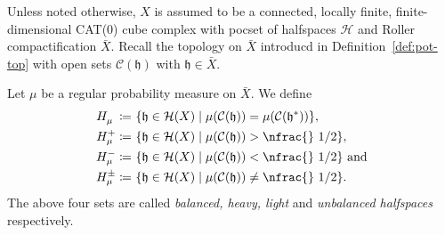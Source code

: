 Unless noted otherwise, \(X\) is assumed to be a connected, locally finite, finite-dimensional CAT(0) cube complex with pocset of halfspaces \(\mathcal{H}\) and Roller compactification \(\bar X\). Recall the topology on \(\bar X\) introducd in Definition~\ref{def:pot-top} with open sets \(\mathcal{C}(\mathfrak{h})\) with \(\mathfrak{h} \in \bar X\).

\begin{defin}
  Let \(\mu\) be a regular probability measure on \(\bar X\). We define
  \begin{align*}
    H_\mu^{\phantom{+}} \coloneqq &\ \{\mathfrak{h} \in \mathcal{H}(X) \mid \mu(\mathcal{C}(\mathfrak{h})) = \mu(\mathcal{C}(\mathfrak{h}^\ast))\},\\
    H_\mu^+ \coloneqq &\ \{\mathfrak{h} \in \mathcal{H}(X) \mid \mu(\mathcal{C}(\mathfrak{h})) > \text{\nfrac{} 1/2} \},\\
    H_\mu^- \coloneqq &\ \{\mathfrak{h} \in \mathcal{H}(X) \mid \mu(\mathcal{C}(\mathfrak{h})) < \text{\nfrac{} 1/2}\} \text{ and}\\
    H_\mu^\pm \coloneqq &\ \{\mathfrak{h} \in \mathcal{H}(X) \mid \mu(\mathcal{C}(\mathfrak{h})) \neq \text{\nfrac{} 1/2}\}.
  \end{align*} 
  The above four sets are called \emph{balanced, heavy, light} and \emph{unbalanced halfspaces} respectively.
\end{defin}

